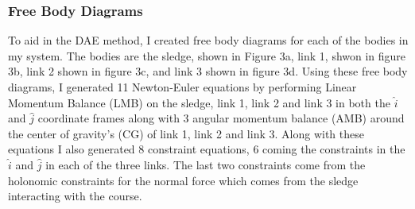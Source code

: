 \documentclass{article}
\begin{document}
\subsubsection{Free Body Diagrams}
To aid in the DAE method, I created free body diagrams for each of the bodies in my system. The bodies are the sledge, shown in Figure 3a, link 1, shwon in figure 3b, link 2 shown in figure 3c, and link 3 shown in figure 3d. Using these free body diagrams, I generated 11 Newton-Euler equations by performing Linear Momentum Balance (LMB) on the sledge, link 1, link 2 and link 3 in both the $\hat{i}$ and $\hat{j}$ coordinate frames along with 3 angular momentum balance (AMB) around the center of gravity's (CG) of link 1, link 2 and link 3. Along with these equations I also generated 8 constraint equations, 6 coming the constraints in the $\hat{i}$ and $\hat{j}$ in each of the three links. The last two constraints come from the holonomic constraints for the normal force which comes from the sledge interacting with the course.
\end{document}
